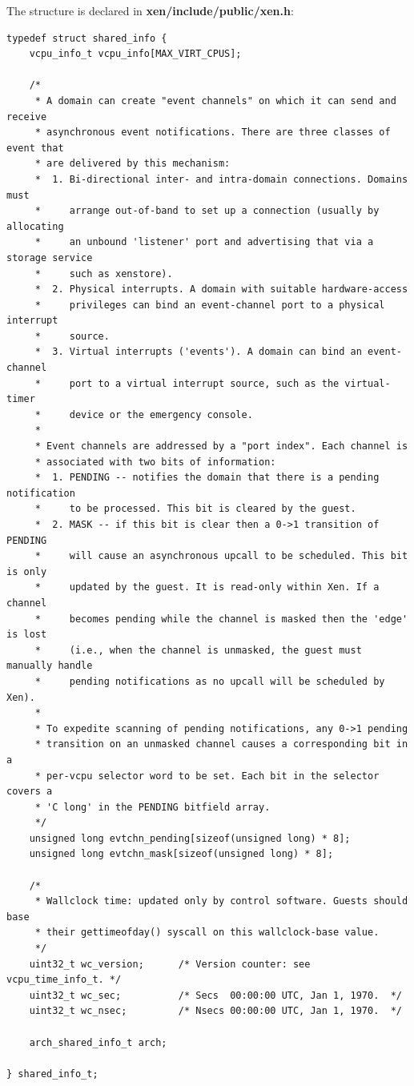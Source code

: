 \documentclass[11pt,twoside,final,openright,a4paper]{report}
\begin{document}
The structure is declared in {\bf xen/include/public/xen.h}:

\scriptsize
\begin{verbatim}
typedef struct shared_info {
    vcpu_info_t vcpu_info[MAX_VIRT_CPUS];

    /*
     * A domain can create "event channels" on which it can send and receive
     * asynchronous event notifications. There are three classes of event that
     * are delivered by this mechanism:
     *  1. Bi-directional inter- and intra-domain connections. Domains must
     *     arrange out-of-band to set up a connection (usually by allocating
     *     an unbound 'listener' port and advertising that via a storage service
     *     such as xenstore).
     *  2. Physical interrupts. A domain with suitable hardware-access
     *     privileges can bind an event-channel port to a physical interrupt
     *     source.
     *  3. Virtual interrupts ('events'). A domain can bind an event-channel
     *     port to a virtual interrupt source, such as the virtual-timer
     *     device or the emergency console.
     * 
     * Event channels are addressed by a "port index". Each channel is
     * associated with two bits of information:
     *  1. PENDING -- notifies the domain that there is a pending notification
     *     to be processed. This bit is cleared by the guest.
     *  2. MASK -- if this bit is clear then a 0->1 transition of PENDING
     *     will cause an asynchronous upcall to be scheduled. This bit is only
     *     updated by the guest. It is read-only within Xen. If a channel
     *     becomes pending while the channel is masked then the 'edge' is lost
     *     (i.e., when the channel is unmasked, the guest must manually handle
     *     pending notifications as no upcall will be scheduled by Xen).
     * 
     * To expedite scanning of pending notifications, any 0->1 pending
     * transition on an unmasked channel causes a corresponding bit in a
     * per-vcpu selector word to be set. Each bit in the selector covers a
     * 'C long' in the PENDING bitfield array.
     */
    unsigned long evtchn_pending[sizeof(unsigned long) * 8];
    unsigned long evtchn_mask[sizeof(unsigned long) * 8];

    /*
     * Wallclock time: updated only by control software. Guests should base
     * their gettimeofday() syscall on this wallclock-base value.
     */
    uint32_t wc_version;      /* Version counter: see vcpu_time_info_t. */
    uint32_t wc_sec;          /* Secs  00:00:00 UTC, Jan 1, 1970.  */
    uint32_t wc_nsec;         /* Nsecs 00:00:00 UTC, Jan 1, 1970.  */

    arch_shared_info_t arch;

} shared_info_t;
\end{verbatim}
\normalsize
\end{document}
